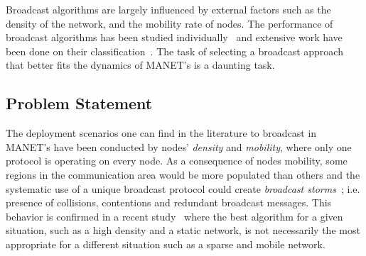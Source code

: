  Broadcast algorithms are largely influenced by external factors such as the density of the network, and the mobility rate of nodes.
%
The performance of broadcast algorithms has been studied individually~\cite{YiGerla2003,Garbinato2010} and extensive work have been done on their classification~\cite{SurveyRuiz,Fei1311289}.
%
The task of selecting a broadcast approach that better fits the dynamics of MANET's  is a daunting task.

\subsection{Problem Statement}
The deployment scenarios one can find  in the literature to broadcast in MANET's have been conducted by nodes' \emph{density} and \emph{mobility}, where only one protocol is operating on every node.
 
As a consequence of nodes mobility, 
 
some regions in the communication area would be more populated than others and the systematic use of a unique broadcast protocol could create \emph{broadcast storms}~\cite{BroadcastStormProblem}; i.e. presence of collisions, contentions and redundant broadcast messages.
 
%
This behavior is confirmed in a recent study~\cite{DensityMobDrivenEval} where the best algorithm for a given situation, such as a high density and a static network, is not necessarily the most appropriate for a different situation such as a sparse and mobile network.

